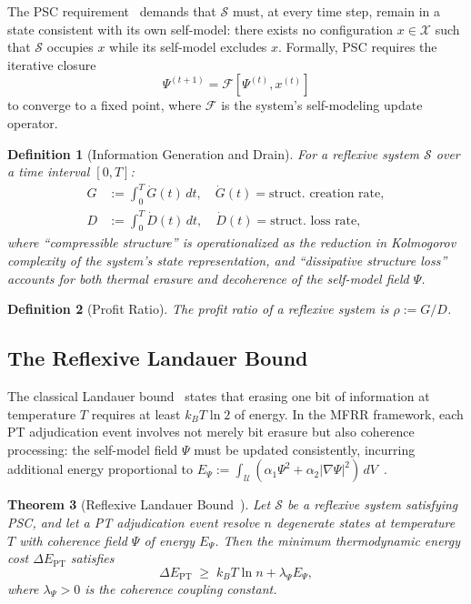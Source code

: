 \documentclass[11pt,twocolumn]{article}
\newtheorem{theorem}{Theorem}[section]
\newtheorem{definition}[theorem]{Definition}
\theoremstyle{remark}
\begin{document}
The PSC requirement~\cite{SpivackPSCOpt}
demands that $\mathcal{S}$ must, at every time step, remain in a state
consistent with its own self-model: there exists no configuration
$x \in \mathcal{X}$ such that $\mathcal{S}$ occupies $x$ while its
self-model excludes $x$. Formally, PSC requires the iterative closure
\[
  \Psi^{(t+1)} = \mathcal{F}[\Psi^{(t)}, x^{(t)}]
\]
to converge to a fixed point, where $\mathcal{F}$ is the system's
self-modeling update operator.

\begin{definition}[Information Generation and Drain]
\label{def:gen-drain}
For a reflexive system $\mathcal{S}$ over a time interval $[0,T]$:
\begin{align}
  G &:= \int_0^T \dot{G}(t)\,dt,
  \quad \dot{G}(t) = \text{struct.\ creation rate},
  \\
  D &:= \int_0^T \dot{D}(t)\,dt,
  \quad \dot{D}(t) = \text{struct.\ loss rate},
\end{align}
where ``compressible structure'' is operationalized as the reduction in
Kolmogorov complexity of the system's state representation, and
``dissipative structure loss'' accounts for both thermal erasure and
decoherence of the self-model field $\Psi$.
\end{definition}

\begin{definition}[Profit Ratio]
\label{def:profit}
The \emph{profit ratio} of a reflexive system is $\rho := G/D$.
\end{definition}

\subsection{The Reflexive Landauer Bound}
\label{sec:framework:rlb}

The classical Landauer bound~\cite{Landauer1961} states that erasing one
bit of information at temperature $T$ requires at least $k_B T \ln 2$
of energy. In the MFRR framework, each PT adjudication event involves
not merely bit erasure but also coherence processing: the self-model
field $\Psi$ must be updated consistently, incurring additional energy
proportional to $E_\Psi := \int_\mathcal{U}(\alpha_1 \Psi^2 +
\alpha_2 |\nabla\Psi|^2)\,dV$~\cite{SpivackNEMSMFRRBridge}.

\begin{theorem}[Reflexive Landauer Bound~\cite{SpivackNEMSMFRRBridge}]
\label{thm:rlb}
Let $\mathcal{S}$ be a reflexive system satisfying PSC, and let a PT
adjudication event resolve $n$ degenerate states at temperature $T$
with coherence field $\Psi$ of energy $E_\Psi$. Then the minimum
thermodynamic energy cost $\Delta E_{\mathrm{PT}}$ satisfies
\[
  \Delta E_{\mathrm{PT}} \;\geq\; k_B T \ln n + \lambda_\Psi E_\Psi,
\]
where $\lambda_\Psi > 0$ is the coherence coupling constant.
\end{theorem}
\end{document}
